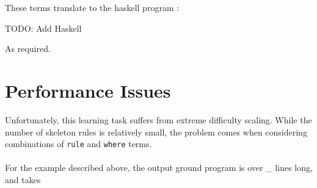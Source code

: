 These terms translate to the haskell program :

TODO: Add Haskell

As required.

\section{Performance Issues}
Unfortunately, this learning task suffers from extreme difficulty scaling. While the number of skeleton rules is relatively small, the problem comes when considering combinations of \lstinline{rule} and \lstinline{where} terms.\\ \\ %
For the example described above, the output ground program is over _ lines long, and takes 

\pagebreak
%
%